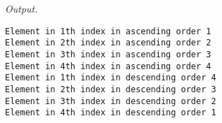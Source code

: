 \documentclass[12pt]{article}
\begin{document}
\textit{Output.}

\begin{lstlisting}
Element in 1th index in ascending order 1
Element in 2th index in ascending order 2
Element in 3th index in ascending order 3
Element in 4th index in ascending order 4
Element in 1th index in descending order 4
Element in 2th index in descending order 3
Element in 3th index in descending order 2
Element in 4th index in descending order 1
\end{lstlisting}


\end{document}
